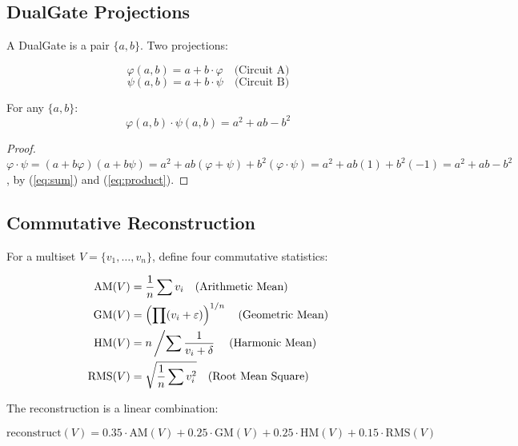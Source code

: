 \documentclass[11pt,a4paper]{article}
\begin{document}
\subsection{DualGate Projections}

A DualGate is a pair $\{a, b\}$. Two projections:

\begin{equation}
\varphi(a,b) = a + b \cdot \varphi \quad \text{(Circuit A)}
\end{equation}
\begin{equation}
\psi(a,b) = a + b \cdot \psi \quad \text{(Circuit B)}
\end{equation}

\begin{lemma}
For any $\{a,b\}$:
\begin{equation}
\varphi(a,b) \cdot \psi(a,b) = a^2 + ab - b^2
\end{equation}
\end{lemma}
\begin{proof}
$\varphi \cdot \psi = (a + b\varphi)(a + b\psi) = a^2 + ab(\varphi + \psi) + b^2(\varphi \cdot \psi) = a^2 + ab(1) + b^2(-1) = a^2 + ab - b^2$, by (\ref{eq:sum}) and (\ref{eq:product}).
\end{proof}

\subsection{Commutative Reconstruction}

For a multiset $V = \{v_1, \ldots, v_n\}$, define four commutative statistics:

\begin{align}
\text{AM}(V) &= \frac{1}{n}\sum v_i \quad \text{(Arithmetic Mean)}\\
\text{GM}(V) &= \left(\prod(v_i + \varepsilon)\right)^{1/n} \quad \text{(Geometric Mean)}\\
\text{HM}(V) &= n \left/ \sum \frac{1}{v_i + \delta} \right. \quad \text{(Harmonic Mean)}\\
\text{RMS}(V) &= \sqrt{\frac{1}{n}\sum v_i^2} \quad \text{(Root Mean Square)}
\end{align}

The reconstruction is a linear combination:

\begin{equation}
\text{reconstruct}(V) = 0.35 \cdot \text{AM}(V) + 0.25 \cdot \text{GM}(V) + 0.25 \cdot \text{HM}(V) + 0.15 \cdot \text{RMS}(V)
\end{equation}
\end{document}
